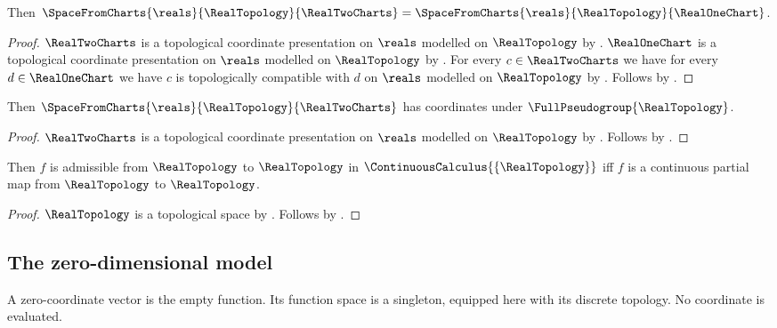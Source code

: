\begin{theorem}\label{real_chart_spaces_equal}
    Then $\SpaceFromCharts{\reals}{\RealTopology}{\RealTwoCharts}
        =\SpaceFromCharts{\reals}{\RealTopology}{\RealOneChart}$.
\end{theorem}
\begin{proof}
    $\RealTwoCharts$ is a topological coordinate presentation on $\reals$
        modelled on $\RealTopology$ by .
    $\RealOneChart$ is a topological coordinate presentation on $\reals$
        modelled on $\RealTopology$ by .
    For every $c\in\RealTwoCharts$ we have for every $d\in\RealOneChart$ we have
        $c$ is topologically compatible with $d$ on $\reals$ modelled on $\RealTopology$
        by .
    Follows by .
\end{proof}

\begin{theorem}\label{real_two_chart_space_coordinates}
    Then $\SpaceFromCharts{\reals}{\RealTopology}{\RealTwoCharts}$
        has coordinates under $\FullPseudogroup{\RealTopology}$.
\end{theorem}
\begin{proof}
    $\RealTwoCharts$ is a topological coordinate presentation on $\reals$
        modelled on $\RealTopology$ by .
    Follows by .
\end{proof}

\begin{theorem}\label{real_continuous_calculus}
    Then $f$ is admissible from $\RealTopology$ to $\RealTopology$ in
        $\ContinuousCalculus{\{\RealTopology\}}$ iff
        $f$ is a continuous partial map from $\RealTopology$ to $\RealTopology$.
\end{theorem}
\begin{proof}
    $\RealTopology$ is a topological space by .
    Follows by .
\end{proof}

\subsection{The zero-dimensional model}

A zero-coordinate vector is the empty function. Its function space is a
singleton, equipped here with its discrete topology. No coordinate is evaluated.

